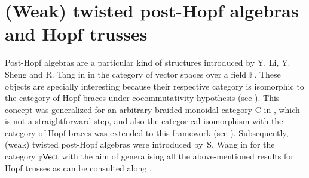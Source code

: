 \documentclass[pdftex]{sigma}
\numberwithin{equation}{section}
\begin{document}
\section{(Weak) twisted post-Hopf algebras and Hopf trusses}\label{s2}
Post-Hopf algebras are a particular kind of structures introduced by Y. Li, Y. Sheng and R. Tang in \cite{LST} in the category of vector spaces over a field $\mathbb{F}$. These objects are specially interesting because their respective category is isomorphic to the category of Hopf braces under cocommutativity hypothesis (see \cite[Theorem 2.12]{LST}). This concept was generalized for an arbitrary braided monoidal category {\sf C} in \cite{FGR}, which is not a straightforward step, and also the categorical isomorphism with the category of Hopf braces was extended to this framework (see \cite[Theorem~3.16 and Corollary~3.17]{FGR}). Subsequently, (weak) twisted post-Hopf algebras were introduced by~S. Wang in \cite{Wang} for the category ${}_{\mathbb{F}}{\sf Vect}$ with the aim of generalising all the above-mentioned results for Hopf trusses as can be consulted along \cite[Section 6]{Wang}.
\end{document}
